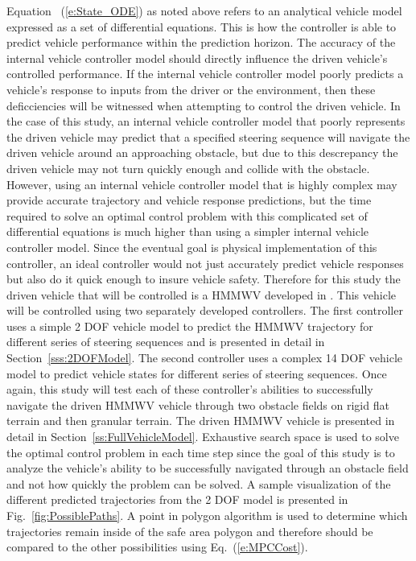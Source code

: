 \documentclass[12pt,twocolumn]{article}
\newcommand{\CHRONO}{{\sffamily{{Chrono}}}}
\begin{document}
Equation ~(\ref{e:State_ODE}) as noted above refers to an analytical vehicle model expressed as a set of differential equations. This is how the controller is able to predict vehicle performance within the prediction horizon. The accuracy of the internal vehicle controller model should directly influence the driven vehicle's controlled performance. If the internal vehicle controller model poorly predicts a vehicle's response to inputs from the driver or the environment, then these deficciencies will be witnessed when attempting to control the driven vehicle. In the case of this study, an internal vehicle controller model that poorly represents the driven vehicle may predict that a specified steering sequence will navigate the driven vehicle around an approaching obstacle, but due to this descrepancy the driven vehicle may not turn quickly enough and collide with the obstacle. However, using an internal vehicle controller model that is highly complex may provide accurate trajectory and vehicle response predictions, but the time required to solve an optimal control problem with this complicated set of differential equations is much higher than using a simpler internal vehicle controller model. Since the eventual goal is physical implementation of this controller, an ideal controller would not just accurately predict vehicle responses but also do it quick enough to insure vehicle safety. Therefore for this study the driven vehicle that will be controlled is a HMMWV developed in {\CHRONO}. This vehicle will be controlled using two separately developed controllers. The first controller uses a simple 2 DOF vehicle model to predict the {\CHRONO}  HMMWV trajectory for different series of steering sequences and is presented in detail in Section~\ref{sss:2DOFModel}. The second controller uses a complex 14 DOF vehicle model to predict vehicle states for different series of steering sequences. Once again, this study will test each of these controller's abilities to successfully navigate the driven {\CHRONO}  HMMWV vehicle through two obstacle fields on rigid flat terrain and then granular terrain. The driven {\CHRONO} HMMWV vehicle is presented in detail in Section~\ref{ss:FullVehicleModel}. Exhaustive search space is used to solve the optimal control problem in each time step since the goal of this study is to analyze the vehicle's ability to be successfully navigated through an obstacle field and not how quickly the problem can be solved. A sample visualization of the different predicted trajectories from the 2 DOF model is presented in Fig.~\ref{fig:PossiblePaths}. A point in polygon algorithm is used to determine which trajectories remain inside of the safe area polygon and therefore should be compared to the other possibilities using Eq.~(\ref{e:MPCCost}).
\end{document}
